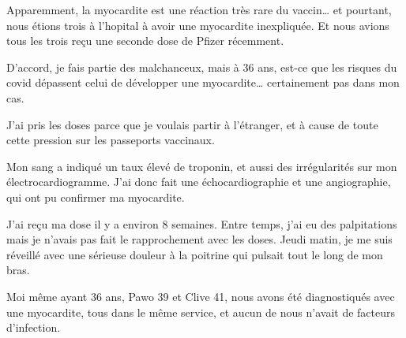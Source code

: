 Apparemment, la myocardite est une réaction très rare du vaccin… et pourtant,
nous étions trois à l'hopital à avoir une myocardite inexpliquée. Et nous avions
tous les trois reçu une seconde dose de Pfizer récemment.

D'accord, je fais partie des malchanceux, mais à 36 ans, est-ce que les risques
du covid dépassent celui de développer une myocardite… certainement pas dans mon
cas.

J'ai pris les doses parce que je voulais partir à l'étranger, et à cause de
toute cette pression sur les passeports vaccinaux.

Mon sang a indiqué un taux élevé de troponin, et aussi des irrégularités sur mon
électrocardiogramme. J'ai donc fait une échocardiographie et une angiographie,
qui ont pu confirmer ma myocardite.

J'ai reçu ma dose il y a environ 8 semaines. Entre temps, j'ai eu des
palpitations mais je n'avais pas fait le rapprochement avec les doses. Jeudi
matin, je me suis réveillé avec une sérieuse douleur à la poitrine qui pulsait
tout le long de mon bras.

Moi même ayant 36 ans, Pawo 39 et Clive 41, nous avons été diagnostiqués avec
une myocardite, tous dans le même service, et aucun de nous n'avait de facteurs
d'infection.

